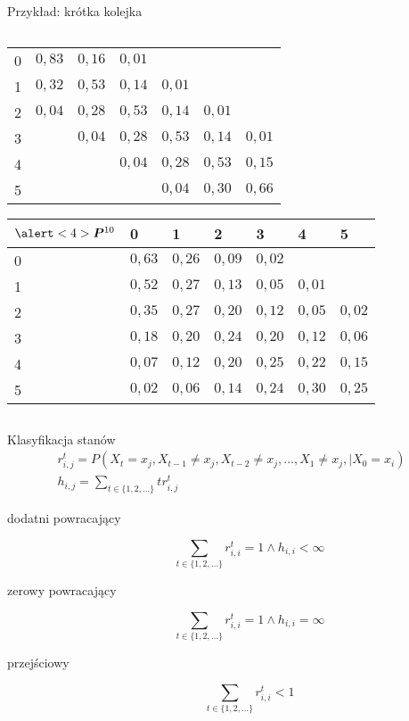 \documentclass{mp}
\begin{document}
\begin{frame}{Przykład: krótka kolejka}
{\begin{columns}[T]
\begin{column}{.49\textwidth}
{{\begin{tabular}{l|llllll}
0 & $0{,}83$ & $0{,}16$ & $0{,}01$ &  &  & \\
1 & $0{,}32$ & $0{,}53$ & $0{,}14$ & $0{,}01$ &  &  \\
2 & $0{,}04$ & $0{,}28$ & $0{,}53$ & $0{,}14$ & $0{,}01$ & \\
3 &  & $0{,}04$ & $0{,}28$ & $0{,}53$ & $0{,}14$ & $0{,}01$ \\
4 &  &  & $0{,}04$ & $0{,}28$ & $0{,}53$ & $0{,}15$ \\
5 &  &  &  & $0{,}04$ & $0{,}30$ & $0{,}66$
\end{tabular}
}
{
\begin{tabular}{l|llllll}
$\alert<4>{\bm{P}^{10}}$ & 0 & 1 & 2 & 3 & 4 & 5\\
\hline
 0 &  $0{,}63$ & $0{,}26$ & $0{,}09$ & $0{,}02$ &  &  \\
 1 &  $0{,}52$ & $0{,}27$ & $0{,}13$ & $0{,}05$ & $0{,}01$ &  \\
 2 &  $0{,}35$ & $0{,}27$ & $0{,}20$ & $0{,}12$ & $0{,}05$ & $0{,}02$ \\
 3 &  $0{,}18$ & $0{,}20$ & $0{,}24$ & $0{,}20$ & $0{,}12$ & $0{,}06$ \\
 4 &  $0{,}07$ & $0{,}12$ & $0{,}20$ & $0{,}25$ & $0{,}22$ & $0{,}15$ \\
 5 &  $0{,}02$ & $0{,}06$ & $0{,}14$ & $0{,}24$ & $0{,}30$ & $0{,}25$ \\
\end{tabular}
}
}
\end{column}
\end{columns}
}
\end{frame}
\begin{frame}{Klasyfikacja stanów}
\begin{gather*}
 r_{i,j}^t=P\left(X_t=x_j, X_{t-1}\neq x_j, X_{t-2}\neq x_j, \ldots, X_1\neq x_j,  | X_0=x_i\right) \\
 h_{i,j}=\sum_{t\in \{1,2,\ldots\}} tr_{i,j}^t
\end{gather*}
\begin{description}
\item[dodatni powracający] \[\sum_{t\in \{1,2,\ldots\}} r_{i,i}^t =1 \land h_{i,i}<\infty\]
\item[zerowy powracający] \[\sum_{t\in \{1,2,\ldots\}} r_{i,i}^t =1 \land h_{i,i}=\infty\]
\item[przejściowy] \[\sum_{t\in \{1,2,\ldots\}} r_{i,i}^t <1 \]
\end{description}
\end{frame}
\end{document}
